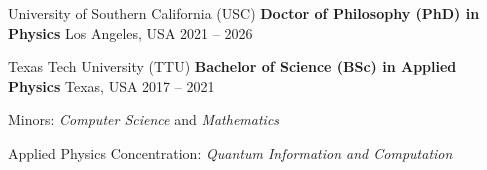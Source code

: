 
\begin{cventries}
  \cventry
  {University of Southern California (USC)}
  { \textbf{Doctor of Philosophy (PhD) in Physics} }
    {Los Angeles, USA}
    {2021 -- 2026}
    {
      \begin{cvitems}
      \end{cvitems}
      \vspace{1em}
    }

  \cventry
  {Texas Tech University (TTU)}
  { \textbf{Bachelor of Science (BSc) in Applied Physics} }
    {Texas, USA}
    {2017 -- 2021}
    {
      \begin{cvitems}
      \item{Minors: \textit{Computer Science} and  \textit{Mathematics}}
      \item{Applied Physics Concentration: \textit{Quantum Information and Computation}}
      \end{cvitems}
      \vspace{1em}
    }
\end{cventries}
